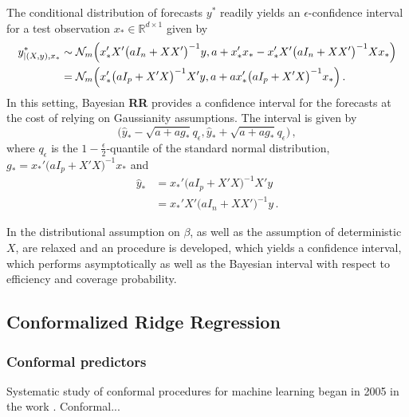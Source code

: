 \documentclass[a4paper,14pt]{article}
\newcommand{\Ncal}{\mathcal{N}}
\newcommand{\Real}{\mathbb{R}}
\begin{document}
The conditional distribution of forecasts $y^*$ readily yields an $\epsilon$-confidence interval
for a test observation $x_*\in\Real^{d\times 1}$ given by
\begin{align*}
  y^*_{|(X, y), x_*}
    & \sim \Ncal_m\Bigl(
        x_*' X' \bigl(a I_n + XX' \bigr)^{-1} y,
        a + x_*' x_* - x_*' X' \bigl(a I_n + XX' \bigr)^{-1} X x_*
      \Bigr) \\
    & = \Ncal_m\Bigl(
        x_*' \bigl(a I_p + X'X\bigr)^{-1} X' y, 
        a + a x_*' \bigl(a I_p + X'X\bigr)^{-1} x_*
      \Bigr)
    \,.
\end{align*}
In this setting, Bayesian \textbf{RR} provides a confidence interval for the forecasts
at the cost of relying on Gaussianity assumptions. The interval is given by
$$ \bigl(
  \hat{y}_* - \sqrt{a + a g_*} q_\epsilon,
  \hat{y}_* + \sqrt{a + a g_*} q_\epsilon
  \bigr) \,, $$
where $q_\epsilon$ is the $1-\frac{\epsilon}{2}$-quantile of the standard normal
distribution, $g_* = x_*' \bigl(a I_p + X'X\bigr)^{-1} x_*$ and
\begin{align*}
\hat{y}_*
  &= x_*' \bigl(a I_p + X'X\bigr)^{-1} X' y \\
  &= x_*' X' \bigl(a I_n + XX' \bigr)^{-1} y \,.
\end{align*}

In \cite{BurVovk2014} the distributional assumption on $\beta$, as well as the assumption
of deterministic $X$, are relaxed and an procedure is developed, which yields a confidence
interval, which performs asymptotically as well as the Bayesian interval with respect to
efficiency and coverage probability.

\subsection{Conformalized Ridge Regression} %
\label{sub:conformalized_ridge_regression}

\subsubsection{Conformal predictors} %
\label{ssub:conformal_predictors}

Systematic study of conformal procedures for machine learning began in 2005 in the work
\cite{Vovketal2005}. Conformal...
\end{document}
